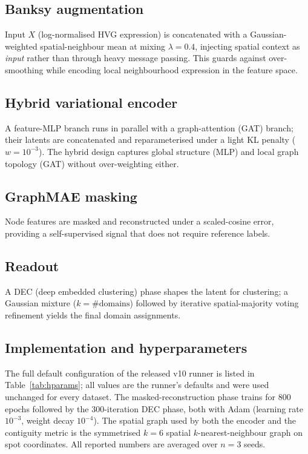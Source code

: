 \documentclass[10pt,letterpaper]{article}
\begin{document}
\subsection{Banksy augmentation}
\label{sec:banksy}

Input $X$ (log-normalised HVG expression) is concatenated with a Gaussian-weighted
spatial-neighbour mean at mixing $\lambda=0.4$, injecting spatial context as \emph{input}
rather than through heavy message passing. This guards against over-smoothing while encoding
local neighbourhood expression in the feature space.

\subsection{Hybrid variational encoder}
\label{sec:encoder}

A feature-MLP branch runs in parallel with a graph-attention (GAT) branch; their latents
are concatenated and reparameterised under a light KL penalty ($w=10^{-3}$). The hybrid
design captures global structure (MLP) and local graph topology (GAT) without
over-weighting either.

\subsection{GraphMAE masking}
\label{sec:mae}

Node features are masked and reconstructed under a scaled-cosine error, providing a
self-supervised signal that does not require reference labels.

\subsection{Readout}
\label{sec:readout}

A DEC (deep embedded clustering) phase shapes the latent for clustering; a Gaussian mixture
($k = \#\text{domains}$) followed by iterative spatial-majority voting refinement yields the
final domain assignments.

\subsection{Implementation and hyperparameters}
\label{sec:hparams}

The full default configuration of the released v10 runner is listed in
Table~\ref{tab:hparams}; all values are the runner's defaults and were used unchanged for
every dataset. The masked-reconstruction phase trains for $800$ epochs followed by the
$300$-iteration DEC phase, both with Adam (learning rate $10^{-3}$, weight decay $10^{-4}$).
The spatial graph used by both the encoder and the contiguity metric is the symmetrised
$k=6$ spatial $k$-nearest-neighbour graph on spot coordinates. All reported numbers are
averaged over $n=3$ seeds.
\end{document}
